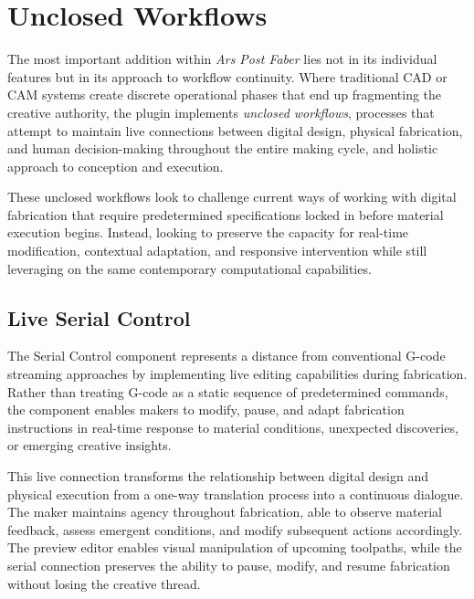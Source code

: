 \section{Unclosed Workflows}

The most important addition within \textit{Ars Post Faber} lies not in its individual features but in its approach to workflow continuity. Where traditional CAD or CAM systems create discrete operational phases that end up fragmenting the creative authority, the plugin implements \textit{unclosed workflows}, processes that attempt to maintain live connections between digital design, physical fabrication, and human decision-making throughout the entire making cycle, and holistic approach to conception and execution.

\vspace{0.5cm}

These unclosed workflows look to challenge current ways of working with digital fabrication that require predetermined specifications locked in before material execution begins. Instead, looking to preserve the capacity for real-time modification, contextual adaptation, and responsive intervention while still leveraging on the same contemporary computational capabilities.

\subsection{Live Serial Control}

The Serial Control component represents a distance from conventional G-code streaming approaches by implementing live editing capabilities during fabrication. Rather than treating G-code as a static sequence of predetermined commands, the component enables makers to modify, pause, and adapt fabrication instructions in real-time response to material conditions, unexpected discoveries, or emerging creative insights.

\vspace{0.5cm}

This live connection transforms the relationship between digital design and physical execution from a one-way translation process into a continuous dialogue. The maker maintains agency throughout fabrication, able to observe material feedback, assess emergent conditions, and modify subsequent actions accordingly. The preview editor enables visual manipulation of upcoming toolpaths, while the serial connection preserves the ability to pause, modify, and resume fabrication without losing the creative thread.

